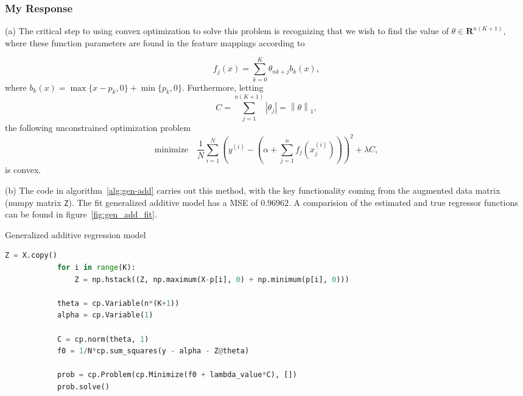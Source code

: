 \documentclass[12pt,reqno]{article}
\theoremstyle{definition}
\numberwithin{equation}{section}
\begin{document}
\subsubsection*{My Response}

\noindent (a) The critical step to using convex optimization to solve this problem is recognizing that
we wish to find the value of $\theta \in \mathbf{R}^{n(K+1)}$, where these function parameters 
are found in the feature mappings according to

\[f_{j}(x) = \sum_{k=0}^{K}\theta_{nk + j} b_k(x),\]
where $b_k(x) = \max\{x-p_k, 0\} + \min\{p_k, 0\}$.
Furthermore, letting
\[C = \sum_{j=1}^{n(K+1)} \left| \theta_j \right| = \left\lVert \theta \right\rVert_{1},\]
the following unconstrained optimization problem
\[\mathrm{minimize} \quad \frac{1}{N} \sum_{i=1}^{N}\left(y^{(i)} - (\alpha + \sum_{j=1}^{n}f_j(x_j^{(i)}) ) \right)^2 + \lambda C,\]
is convex.

\noindent (b) The code in algorithm~\ref{alg:gen-add} carries out this method, with the key
functionality coming from the augmented data matrix (numpy matrix \lstinline|Z|). The fit generalized additive
model has a MSE of $0.96962$. A comparision of the estimated and true regressor functions can be found in
figure~\ref{fig:gen_add_fit}.

\begin{algorithm}[htbp]
    \caption{Generalized additive regression model}
    \centering
        \begin{lstlisting}[language=Python]
            Z = X.copy()
            for i in range(K):
                Z = np.hstack((Z, np.maximum(X-p[i], 0) + np.minimum(p[i], 0)))

            theta = cp.Variable(n*(K+1))
            alpha = cp.Variable(1)

            C = cp.norm(theta, 1)
            f0 = 1/N*cp.sum_squares(y - alpha - Z@theta)

            prob = cp.Problem(cp.Minimize(f0 + lambda_value*C), [])
            prob.solve()
        \end{lstlisting}
    \label{alg:gen-add}
\end{algorithm}
\end{document}
